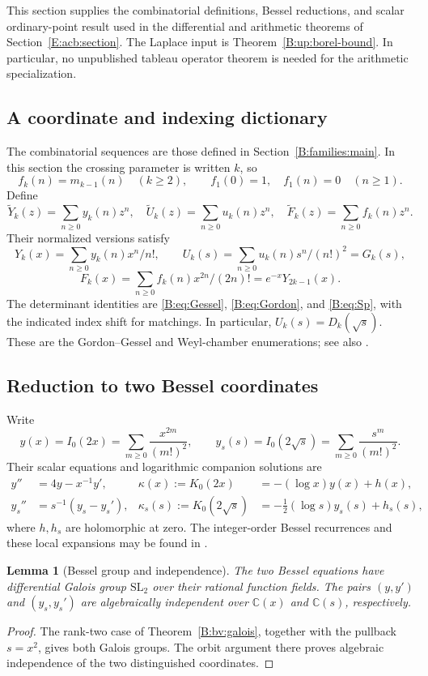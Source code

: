\documentclass[11pt,a4paper]{article}
\newtheorem{lemma}[theorem]{Lemma}
\theoremstyle{definition}
\theoremstyle{remark}
\numberwithin{equation}{section}
\begin{document}
This section supplies the combinatorial definitions, Bessel reductions,
and scalar ordinary-point result used in the differential and arithmetic
theorems of Section~\ref{E:acb:section}.  The Laplace input is
Theorem~\ref{B:up:borel-bound}.  In particular, no unpublished tableau
operator theorem is needed for the arithmetic specialization.


\subsection{A coordinate and indexing dictionary}
The combinatorial sequences are those defined in
Section~\ref{B:families:main}. In this section the crossing parameter is
written $k$, so
\[
 f_k(n)=m_{k-1}(n)\quad(k\ge2),\qquad
 f_1(0)=1,\quad f_1(n)=0\quad(n\ge1).
\]
Define
\[
 \widetilde Y_k(z)=\sum_{n\ge0}y_k(n)z^n,\quad
 \widetilde U_k(z)=\sum_{n\ge0}u_k(n)z^n,\quad
 \widetilde F_k(z)=\sum_{n\ge0}f_k(n)z^n.
\]
Their normalized versions satisfy
\[
 Y_k(x)=\sum_{n\ge0}y_k(n)x^n/n!,\qquad
 U_k(s)=\sum_{n\ge0}u_k(n)s^n/(n!)^2=G_k(s),
\]
\[
 F_k(x)=\sum_{n\ge0}f_k(n)x^{2n}/(2n)!
             =e^{-x}Y_{2k-1}(x).
\]
The determinant identities are \eqref{B:eq:Gessel},
\eqref{B:eq:Gordon}, and \eqref{B:eq:Sp}, with the indicated
index shift for matchings. In particular, $U_k(s)=D_k(\sqrt{s})$.
These are the Gordon--Gessel and Weyl-chamber enumerations; see also
\cite{SFB_GrabinerMagyar,SFB_JinReidysWang}.

\subsection{Reduction to two Bessel coordinates}

Write
\[
 y(x)=I_0(2x)=\sum_{m\ge0}\frac{x^{2m}}{(m!)^2},\qquad
 y_s(s)=I_0(2\sqrt{s})=\sum_{m\ge0}\frac{s^m}{(m!)^2}.
\]
Their scalar equations and logarithmic companion solutions are
\begin{align}
 y''&=4y-x^{-1}y',&
 \kappa(x):=K_0(2x)&=-(\log x)y(x)+h(x),\label{E:sfb:besselx}\\
 y_s''&=s^{-1}(y_s-y_s'),&
 \kappa_s(s):=K_0(2\sqrt{s})
       &=-\tfrac12(\log s)y_s(s)+h_s(s),\label{E:sfb:bessels}
\end{align}
where $h,h_s$ are holomorphic at zero.  The integer-order Bessel
recurrences and these local expansions may be found in
\cite[\S\S10.29, 10.31]{DLMF}.

\begin{lemma}[Bessel group and independence]\label{E:sfb:independence}
The two Bessel equations have differential Galois group
$\mathrm{SL}_2$ over their rational function fields.  The
pairs $(y,y')$ and $(y_s,y_s')$ are algebraically independent
over $\mathbb C(x)$ and $\mathbb C(s)$, respectively.
\end{lemma}
\begin{proof}
The rank-two case of Theorem~\ref{B:bv:galois}, together with
the pullback $s=x^2$, gives both Galois groups. The orbit argument
there proves algebraic independence of the two distinguished coordinates.
\end{proof}
\end{document}
